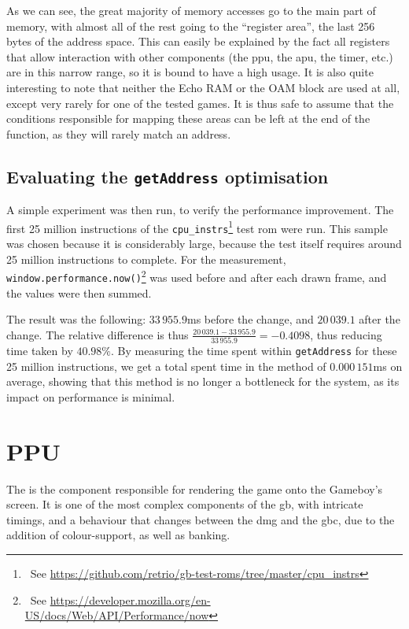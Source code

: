 \documentclass[11pt]{informatics-report}
\newcommand{\ftnt}[1]{\footnote{~See \url{#1}}}
\begin{document}
As we can see, the great majority of memory accesses go to the main part of memory, with almost all of the rest going to the ``register area'', the last 256 bytes of the address space. This can easily be explained by the fact all registers that allow interaction with other components (the \gls{ppu}, the \gls{apu}, the timer, etc.) are in this narrow range, so it is bound to have a high usage. It is also quite interesting to note that neither the Echo RAM or the OAM block are used at all, except very rarely for one of the tested games. It is thus safe to assume that the conditions responsible for mapping these areas can be left at the end of the function, as they will rarely match an address.

\subsection{Evaluating the \texttt{getAddress} optimisation}

A simple experiment was then run, to verify the performance improvement. The first 25 million instructions of the \texttt{cpu\_instrs}\ftnt{https://github.com/retrio/gb-test-roms/tree/master/cpu_instrs} test \gls{rom} were run. This sample was chosen because it is considerably large, because the test itself requires around 25 million instructions to complete. For the measurement, \texttt{window.performance.now()}\ftnt{https://developer.mozilla.org/en-US/docs/Web/API/Performance/now} was used before and after each drawn frame, and the values were then summed.

The result was the following: $33\,955.9$ms before the change, and $20\,039.1$ after the change. The relative difference is thus $\frac{20\,039.1-33\,955.9}{33\,955.9}=-0.4098$, thus reducing time taken by $40.98\%$. By measuring the time spent within \texttt{getAddress} for these 25 million instructions, we get a total spent time in the method of $0.000\,151$ms on average, showing that this method is no longer a bottleneck for the system, as its impact on performance is minimal.

\section{PPU}

The  is the component responsible for rendering the game onto the Gameboy's screen. It is one of the most complex components of the \gls{gb}, with intricate timings, and a behaviour that changes between the \gls{dmg} and the \gls{gbc}, due to the addition of colour-support, as well as  banking.
\end{document}
